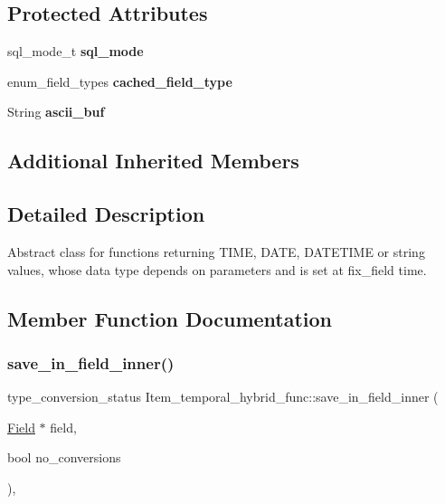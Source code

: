 \subsection*{Protected Attributes}
\begin{DoxyCompactItemize}
\item 
\mbox{\label{classItem__temporal__hybrid__func_a19ea1b9c9d5765050eab8d24236f2124}} 
sql\+\_\+mode\+\_\+t {\bfseries sql\+\_\+mode}
\item 
\mbox{\label{classItem__temporal__hybrid__func_a47b955058870c4b09618d666bbc15587}} 
enum\+\_\+field\+\_\+types {\bfseries cached\+\_\+field\+\_\+type}
\item 
\mbox{\label{classItem__temporal__hybrid__func_ab2bf1fb024b3fe0929e796969faecbf6}} 
String {\bfseries ascii\+\_\+buf}
\end{DoxyCompactItemize}
\subsection*{Additional Inherited Members}


\subsection{Detailed Description}
Abstract class for functions returning T\+I\+ME, D\+A\+TE, D\+A\+T\+E\+T\+I\+ME or string values, whose data type depends on parameters and is set at fix\+\_\+field time. 

\subsection{Member Function Documentation}
\mbox{\label{classItem__temporal__hybrid__func_a3f3134574bdb6dd08a1cdd7078806368}} 
\subsubsection{\texorpdfstring{save\+\_\+in\+\_\+field\+\_\+inner()}{save\_in\_field\_inner()}}
{\footnotesize\ttfamily type\+\_\+conversion\+\_\+status Item\+\_\+temporal\+\_\+hybrid\+\_\+func\+::save\+\_\+in\+\_\+field\+\_\+inner (\begin{DoxyParamCaption}\item[{\mbox{\hyperlink{classField}{Field}} $\ast$}]{field,  }\item[{bool}]{no\+\_\+conversions }\end{DoxyParamCaption})\hspace{0.3cm}{\ttfamily [protected]}, {\ttfamily [virtual]}}

